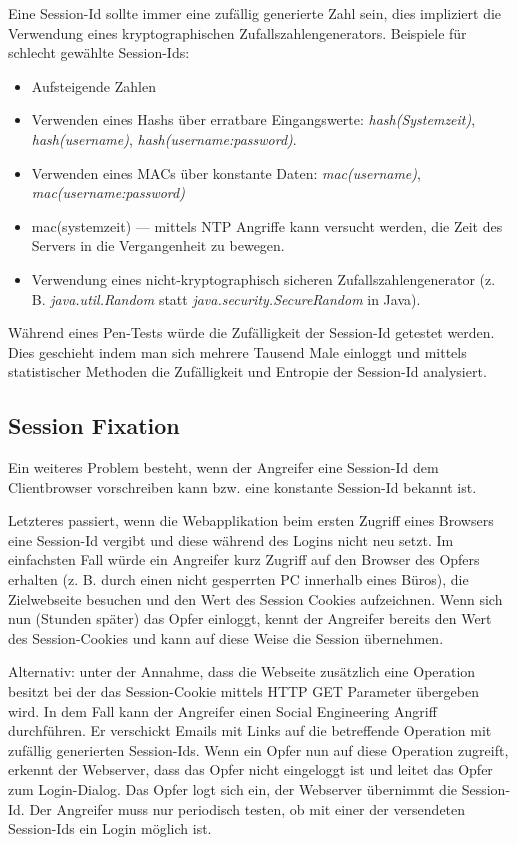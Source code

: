 Eine Session-Id sollte immer eine zufällig generierte Zahl sein, dies impliziert die Verwendung eines kryptographischen Zufallszahlengenerators. Beispiele für schlecht gewählte Session-Ids:

\begin{itemize}
	\item Aufsteigende Zahlen
	\item Verwenden eines Hashs über erratbare Eingangswerte: \textit{hash(Systemzeit)}, \textit{hash(username)}, \textit{hash(username:password)}.
	\item Verwenden eines MACs über konstante Daten: \textit{mac(username)}, \textit{mac(username:password)}
	\item mac(systemzeit) --- mittels NTP Angriffe kann versucht werden, die Zeit des Servers in die Vergangenheit zu bewegen.
	\item Verwendung eines nicht-kryptographisch sicheren Zufallszahlengenerator (z. B. \textit{java.util.Random} statt \textit{java.security.SecureRandom} in Java).
\end{itemize}

Während eines Pen-Tests würde die Zufälligkeit der Session-Id getestet werden. Dies geschieht indem man sich mehrere Tausend Male einloggt und mittels statistischer Methoden die Zufälligkeit und Entropie der Session-Id analysiert.

\subsection{Session Fixation}

Ein weiteres Problem besteht, wenn der Angreifer eine Session-Id dem Clientbrowser vorschreiben kann bzw. eine konstante Session-Id bekannt ist.

Letzteres passiert, wenn die Webapplikation beim ersten Zugriff eines Browsers eine Session-Id vergibt und diese während des Logins nicht neu setzt. Im einfachsten Fall würde ein Angreifer kurz Zugriff auf den Browser des Opfers erhalten (z. B. durch einen nicht gesperrten PC innerhalb eines Büros), die Zielwebseite besuchen und den Wert des Session Cookies aufzeichnen. Wenn sich nun (Stunden später) das Opfer einloggt, kennt der Angreifer bereits den Wert des Session-Cookies und kann auf diese Weise die Session übernehmen.

Alternativ: unter der Annahme, dass die Webseite zusätzlich eine Operation besitzt bei der das Session-Cookie mittels HTTP GET Parameter übergeben wird. In dem Fall kann der Angreifer einen Social Engineering Angriff durchführen. Er verschickt Emails mit Links auf die betreffende Operation mit zufällig generierten Session-Ids. Wenn ein Opfer nun auf diese Operation zugreift, erkennt der Webserver, dass das Opfer nicht eingeloggt ist und leitet das Opfer zum Login-Dialog. Das Opfer logt sich ein, der Webserver übernimmt die Session-Id. Der Angreifer muss nur periodisch testen, ob mit einer der versendeten Session-Ids ein Login möglich ist.

